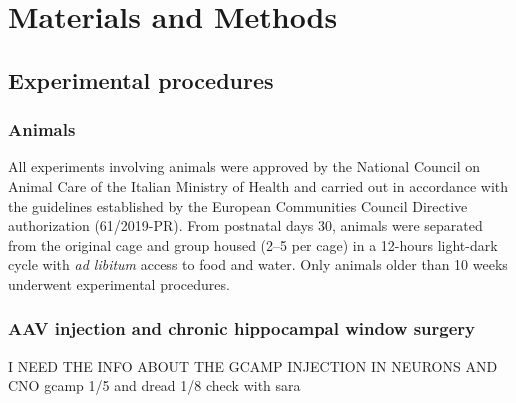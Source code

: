 
\chapter{Materials and Methods} %

\label{Chapter3} %

\section{Experimental procedures}
\label{chap3:sec:1:exp_proc}
\subsection{Animals}
All experiments involving animals were approved by the National Council on Animal Care of the Italian Ministry of Health and carried out in accordance with the guidelines established by the European Communities Council Directive authorization (61/2019-PR). 
From postnatal days 30, animals were separated from the original cage and group housed (2–5 per cage) in a 12-hours light-dark cycle with \textit{ad libitum} access to food and water. 
Only animals older than 10 weeks underwent experimental procedures. 

\subsection{AAV injection and chronic hippocampal window surgery}
I NEED THE INFO ABOUT THE GCAMP INJECTION IN NEURONS AND CNO
gcamp 1/5 and dread 1/8 check with sara


